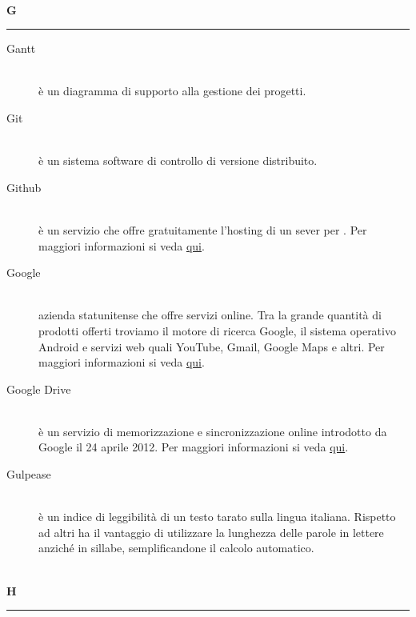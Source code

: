 \documentclass[12pt,a4paper]{article}
\begin{document}
\newpage

\begin{center}
\hfill\\
	\LARGE \textbf{G}
\hfill\\
\rule[15pt]{30pt}{0.5pt}
\end{center}

\begin{description}
\item[Gantt] 
\hfill\\ è un diagramma di supporto alla gestione dei progetti.

\item[Git] 
\hfill\\ è un sistema software di controllo di versione distribuito.

\item[Github] 
\hfill\\ è un servizio che offre gratuitamente l'hosting di un sever per . Per maggiori informazioni si veda \href{https://github.com}{qui}.

\item[Google] 
\hfill\\ azienda statunitense che offre servizi online. Tra la grande quantità di prodotti offerti troviamo il motore di ricerca Google, il sistema operativo Android e servizi web quali YouTube, Gmail, Google Maps e altri. Per maggiori informazioni si veda \href{https://it.wikipedia.org/wiki/Google_Inc.}{qui}.

\item[Google Drive] 
\hfill\\ è un servizio di memorizzazione e sincronizzazione online introdotto da Google il 24 aprile 2012. Per maggiori informazioni si veda \href{https://it.wikipedia.org/wiki/Google_Drive}{qui}.

\item[Gulpease] 
\hfill\\ è un indice di leggibilità di un testo tarato sulla lingua italiana. Rispetto ad altri ha il vantaggio di utilizzare la lunghezza delle parole in lettere anziché in sillabe, semplificandone il calcolo automatico.
\end{description}

\newpage

\begin{center}
\hfill\\
	\LARGE \textbf{H}
\hfill\\
\rule[15pt]{30pt}{0.5pt}
\end{center}
\end{document}
